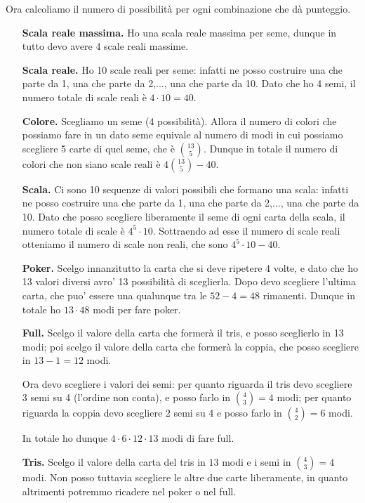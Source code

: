 Ora calcoliamo il numero di possibilità per ogni combinazione che dà punteggio.
\begin{itemize}
    \item[\textbf{Scala reale massima.}] Ho una scala reale massima per seme, dunque in tutto devo avere 4 scale reali massime.
    \item[\textbf{Scala reale.}] Ho 10 scale reali per seme: infatti ne posso costruire una che parte da 1, una che parte da 2,..., una che parte da 10. Dato che ho 4 semi, il numero totale di scale reali è $4 \cdot 10 = 40$. 
    \item[\textbf{Colore.}] Scegliamo un seme (4 possibilità). Allora il numero di colori che possiamo fare in un dato seme equivale al numero di modi in cui possiamo scegliere 5 carte di quel seme, che è $\binom{13}{5}$. Dunque in totale il numero di colori che non siano scale reali è $4\binom{13}{5}-40$.
    \item[\textbf{Scala.}] Ci sono 10 sequenze di valori possibili che formano una scala: infatti ne posso costruire una che parte da 1, una che parte da 2,..., una che parte da 10. Dato che posso scegliere liberamente il seme di ogni carta della scala, il numero totale di scale è $4^5 \cdot 10$. Sottraendo ad esse il numero di scale reali otteniamo il numero di scale non reali, che sono $4^5 \cdot 10 - 40$.
    \item[\textbf{Poker.}] Scelgo innanzitutto la carta che si deve ripetere 4 volte, e dato che ho 13 valori diversi avro' 13 possibilità di sceglierla. Dopo devo scegliere l'ultima carta, che puo' essere una qualunque tra le $52 - 4 = 48$ rimanenti. Dunque in totale ho $13\cdot 48$ modi per fare poker.
    \item[\textbf{Full.}] Scelgo il valore della carta che formerà il tris, e posso sceglierlo in 13 modi; poi scelgo il valore della carta che formerà la coppia, che posso scegliere in $13-1 = 12$ modi. 
    
    Ora devo scegliere i valori dei semi: per quanto riguarda il tris devo scegliere 3 semi su 4 (l'ordine non conta), e posso farlo in $\binom{4}{3} = 4$ modi; per quanto riguarda la coppia devo scegliere 2 semi su 4 e posso farlo in $\binom{4}{2} = 6$ modi. 
    
    In totale ho dunque $4\cdot 6\cdot 12 \cdot 13$ modi di fare full. 
    \item[\textbf{Tris.}] Scelgo il valore della carta del tris in $13$ modi e i semi in $\binom{4}{3} = 4$ modi. Non posso tuttavia scegliere le altre due carte liberamente, in quanto altrimenti potremmo ricadere nel poker o nel full. 
    

\end{itemize}
